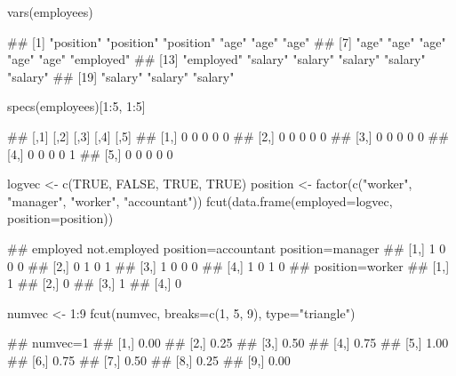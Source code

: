 \documentclass{article}\usepackage[]{graphicx}\usepackage[]{color}
\begin{document}
\begin{Schunk}
% --begin: "lcut.vars"
\begin{Sinput}
vars(employees)
\end{Sinput}
\begin{Soutput}
##  [1] "position" "position" "position" "age"      "age"      "age"     
##  [7] "age"      "age"      "age"      "age"      "age"      "employed"
## [13] "employed" "salary"   "salary"   "salary"   "salary"   "salary"  
## [19] "salary"   "salary"   "salary"
\end{Soutput}
%
% --end: "lcut.vars"
\end{Schunk}

\begin{Schunk}
% --begin: "lcut.specs"
\begin{Sinput}
specs(employees)[1:5, 1:5]
\end{Sinput}
\begin{Soutput}
##      [,1] [,2] [,3] [,4] [,5]
## [1,]    0    0    0    0    0
## [2,]    0    0    0    0    0
## [3,]    0    0    0    0    0
## [4,]    0    0    0    0    1
## [5,]    0    0    0    0    0
\end{Soutput}
%
% --end: "lcut.specs"
\end{Schunk}

\begin{Schunk}
% --begin: "fcut.logfact"
\begin{Sinput}
logvec <- c(TRUE, FALSE, TRUE, TRUE)
position <- factor(c("worker", "manager", "worker", "accountant"))
fcut(data.frame(employed=logvec, position=position))
\end{Sinput}
\begin{Soutput}
##      employed not.employed position=accountant position=manager
## [1,]        1            0                   0                0
## [2,]        0            1                   0                1
## [3,]        1            0                   0                0
## [4,]        1            0                   1                0
##      position=worker
## [1,]               1
## [2,]               0
## [3,]               1
## [4,]               0
\end{Soutput}
%
% --end: "fcut.logfact"
\end{Schunk}

\begin{Schunk}
% --begin: "fcut.numeric1"
\begin{Sinput}
numvec <- 1:9
fcut(numvec,
     breaks=c(1, 5, 9),
     type="triangle")
\end{Sinput}
\begin{Soutput}
##       numvec=1
##  [1,]     0.00
##  [2,]     0.25
##  [3,]     0.50
##  [4,]     0.75
##  [5,]     1.00
##  [6,]     0.75
##  [7,]     0.50
##  [8,]     0.25
##  [9,]     0.00
\end{Soutput}
%
% --end: "fcut.numeric1"
\end{Schunk}
\end{document}
